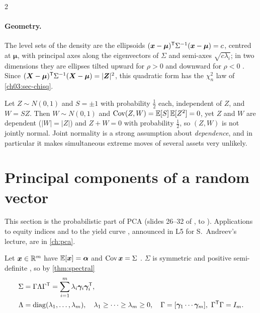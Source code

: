 \begin{paracol}{2}
\paragraph{Geometry.} The level sets of the density are the ellipsoids $(\bm x-\bm\mu)^{\mathsf T}\Sigma^{-1}(\bm x-\bm\mu)=c$, centred at
$\bm\mu$, with principal axes along the eigenvectors of $\Sigma$ and semi-axes $\sqrt{c\lambda_i}$; in two dimensions they
are ellipses tilted upward for $\rho>0$ and downward for $\rho<0$ . Since
$(\bm X-\bm\mu)^{\mathsf T}\Sigma^{-1}(\bm X-\bm\mu)=|\bm Z|^2$, this quadratic form has the $\chi^2_n$ law of \cref{ch03:sec-chisq}.

\begin{remark}
Let $Z\sim N(0,1)$ and $S=\pm1$ with probability $\frac12$ each, independent of $Z$, and $W=SZ$. Then $W\sim N(0,1)$ and
$\operatorname{Cov}(Z,W)=\mathbb{E}[S]\,\mathbb{E}[Z^2]=0$, yet $Z$ and $W$ are dependent ($|W|=|Z|$) and $Z+W=0$ with probability $\frac12$, so
$(Z,W)$ is not jointly normal. Joint normality is a strong assumption about \emph{dependence}, and in
particular it makes simultaneous extreme moves of several assets very unlikely.
\end{remark}

\section{Principal components of a random vector}\label{ch03:sec-pca}

\begin{coursenote}[Scope]
This section is the probabilistic part of PCA (slides 26--32 of ,  to
). Applications to equity indices and to the yield curve , announced in L5 for
S.~Andreev's lecture, are in \cref{ch:pca}.
\end{coursenote}

Let $\bm x\in\mathbb{R}^m$ have $\mathbb{E}[\bm x]=\bm\alpha$ and $\operatorname{Cov}\bm x=\Sigma$ . $\Sigma$ is symmetric and positive
semi-definite , so by \cref{thm:spectral}
\begin{align*}
  \Sigma&=\Gamma\Lambda\Gamma^{\mathsf T}=\sum_{i=1}^m\lambda_i\bm\gamma_i\bm\gamma_i^{\mathsf T},\\
  \Lambda&=\operatorname{diag}(\lambda_1,\dots,\lambda_m),\quad
  \lambda_1\ge\dots\ge\lambda_m\ge0,\quad
  \Gamma=[\bm\gamma_1\cdots\bm\gamma_m],\ \Gamma^{\mathsf T}\Gamma=I_m .
\end{align*}


\end{paracol}
